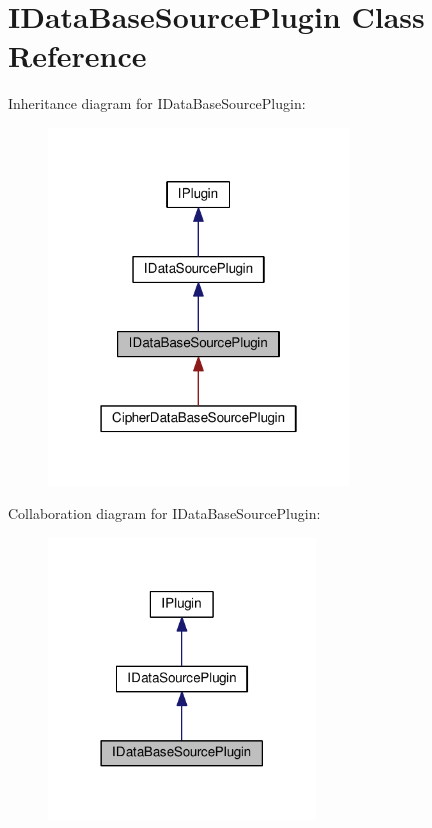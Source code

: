 \hypertarget{class_i_data_base_source_plugin}{}\section{I\+Data\+Base\+Source\+Plugin Class Reference}
\label{class_i_data_base_source_plugin}


Inheritance diagram for I\+Data\+Base\+Source\+Plugin\+:\nopagebreak
\begin{figure}[H]
\begin{center}
\leavevmode
\includegraphics[width=226pt]{class_i_data_base_source_plugin__inherit__graph}
\end{center}
\end{figure}


Collaboration diagram for I\+Data\+Base\+Source\+Plugin\+:\nopagebreak
\begin{figure}[H]
\begin{center}
\leavevmode
\includegraphics[width=201pt]{class_i_data_base_source_plugin__coll__graph}
\end{center}
\end{figure}
